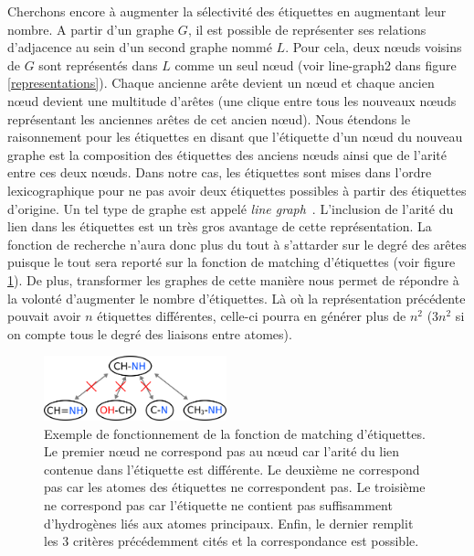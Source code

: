 Cherchons encore à augmenter la sélectivité des étiquettes en augmentant leur nombre.
A partir d'un graphe $G$, il est possible de représenter ses relations d'adjacence au sein d'un second graphe nommé $L$.
Pour cela, deux n\oe{}uds voisins de $G$ sont représentés dans $L$ comme un seul n\oe{}ud (voir line-graph2 dans figure \ref{representations}).
Chaque ancienne arête devient un n\oe{}ud et chaque ancien n\oe{}ud devient une multitude d'arêtes (une clique entre tous les nouveaux n\oe{}uds représentant les anciennes arêtes de cet ancien n\oe{}ud).
Nous étendons le raisonnement pour les étiquettes en disant que l'étiquette d'un n\oe{}ud du nouveau graphe est la composition des étiquettes des anciens n\oe{}uds ainsi que de l'arité entre ces deux n\oe{}uds.
Dans notre cas, les étiquettes sont mises dans l'ordre lexicographique pour ne pas avoir deux étiquettes possibles à partir des étiquettes d'origine.
Un tel type de graphe est appelé \textit{line graph}~\cite{orlin_line-digraphs_1978}.
L'inclusion de l'arité du lien dans les étiquettes est un très gros avantage de cette représentation.
La fonction de recherche n'aura donc plus du tout à s'attarder sur le degré des arêtes puisque le tout sera reporté sur la fonction de matching d'étiquettes (voir figure \ref{label_matching}).
De plus, transformer les graphes de cette manière nous permet de répondre à la volonté d'augmenter le nombre d'étiquettes.
Là où la représentation précédente pouvait avoir $n$ étiquettes différentes, celle-ci pourra en générer plus de $n^2$ ($3n^2$ si on compte tous le degré des liaisons entre atomes).

\begin{figure}[!ht]
  \begin{center}
    \includegraphics[width=200px]{Figures/s2m/recherche/strict.png}
    \caption{\label{label_matching}Exemple de fonctionnement de la fonction de matching d'étiquettes.
    Le premier n\oe{}ud ne correspond pas au n\oe{}ud car l'arité du lien contenue dans l'étiquette est différente.
    Le deuxième ne correspond pas car les atomes des étiquettes ne correspondent pas.
    Le troisième ne correspond pas car l'étiquette ne contient pas suffisamment d'hydrogènes liés aux atomes principaux.
    Enfin, le dernier remplit les 3 critères précédemment cités et la correspondance est possible.}
  \end{center}
\end{figure}

